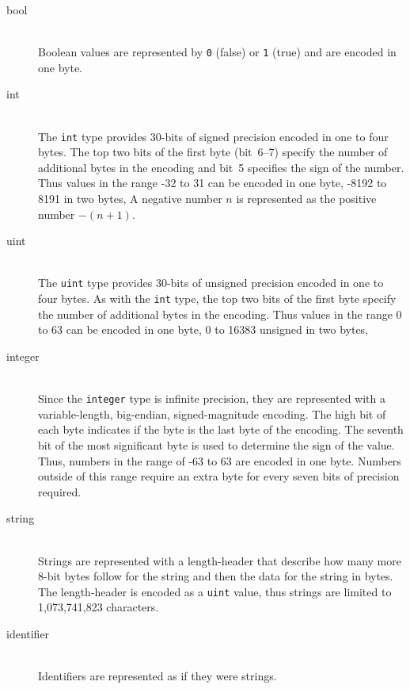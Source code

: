 \begin{description}
  \item[bool] \mbox{}\\
    Boolean values are represented by \lstinline!0! (false) or \lstinline!1! (true)
    and are encoded in one byte.

 \item[int] \mbox{}\\
    The \lstinline!int! type provides 30-bits of signed precision encoded in one to
    four bytes.
    The top two bits of the first byte (bit~6--7) specify the number of additional
    bytes in the encoding and bit~5 specifies the sign of the number.
    Thus values in the range -32 to 31 can be encoded in one byte,
    -8192 to 8191 in two bytes, \etc{}
    A negative number $n$ is represented as the positive number $-(n+1)$.

  \item[uint] \mbox{}\\
    The \lstinline!uint! type provides 30-bits of unsigned precision encoded in one
    to four bytes.
    As with the \lstinline!int! type, the top two bits of the first byte specify the
    number of additional bytes in the encoding.
    Thus values in the range 0 to 63 can be encoded in one byte,
    0 to 16383 unsigned in two bytes, \etc{}

  \item[integer] \mbox{}\\
    Since the \asdl{} \lstinline!integer! type is infinite precision, they are
    represented with a variable-length, big-endian, signed-magnitude encoding.
    The high bit of each byte indicates if the byte is the last byte of
    the encoding.
    The seventh bit of the most significant byte is used to determine the
    sign of the value.
    Thus, numbers in the range of -63 to 63 are encoded in one byte.
    Numbers outside of this range require an extra byte for every seven bits
    of precision required.

  \item[string] \mbox{}\\
    Strings are represented with a length-header that describe how many more
    8-bit bytes follow for the string and then the data for the string in bytes.
    The length-header is encoded as a \lstinline!uint! value, thus strings are limited
    to 1,073,741,823 characters.

  \item[identifier] \mbox{}\\
    Identifiers are represented as if they were strings. 


\end{description}
